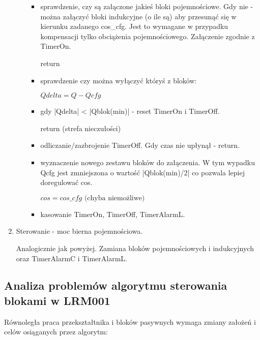\documentclass[12pt,a4paper]{article}
\begin{document}
\begin{enumerate}
\begin{itemize}
\begin{itemize}
			\item sprawdzenie, czy są załączone jakieś bloki pojemnościowe. Gdy nie - można załączyć
			bloki indukcyjne (o ile są) aby przesunąć się w kierunku zadanego cos\_cfg.
			Jest to wymagane w przypadku kompensacji tylko obciążenia pojemnościowego.
			Załączenie zgodnie z TimerOn. 
			
			return
			
			\item sprawdzenie czy można wyłączyć któryś z bloków:
			
			$Qdelta = Q - Qcfg$
			
			\item gdy |Qdelta| < |Qblok(min)| - reset TimerOn i TimerOff.
			
			return (strefa nieczułości)
			\item odliczanie/zazbrojenie TimerOff. Gdy czas nie upłynął - return.
			\item wyznaczenie nowego zestawu bloków do załączenia. W tym wypadku Qcfg jest zmniejszona
			o wartość |Qblok(min)/2| co pozwala lepiej doregulować cos.
			
			$cos = cos\_cfg \text{  (chyba niemożliwe)}$
			
			\item kasowanie TimerOn, TimerOff, TimerAlarmL.
		\vspace{-2mm}
		\end{itemize}

		\vspace{-2mm}
	\end{itemize}

	\item Sterowanie - moc bierna pojemnościowa.
	
	Analogicznie jak powyżej.
	Zamiana bloków pojemnościowych i indukcyjnych oraz TimerAlarmC i TimerAlarmL.
	\vspace{-2mm}
\end{enumerate}

\subsection{Analiza problemów algorytmu sterowania blokami w LRM001}
Równoległa praca przekształtnika i bloków pasywnych wymaga zmiany założeń i celów osiąganych przez algorytm:
\end{document}
